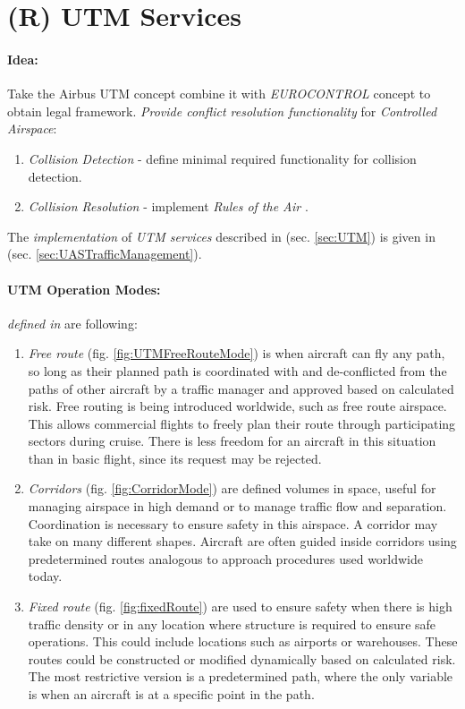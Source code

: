\section{(R) UTM Services}\label{s:utmServicesTheory}
\paragraph{Idea:} Take the Airbus UTM concept \cite{airbusUTM2018blueprint} combine it with \emph{EUROCONTROL} concept \cite{andrewhately2018} to obtain legal framework. \emph{Provide conflict resolution functionality} for \emph{Controlled Airspace}:
\begin{enumerate}
    \item \emph{Collision Detection} - define minimal required functionality for collision detection.
    \item \emph{Collision Resolution} - implement \emph{Rules of the Air} \cite{standard1986recommended}.
\end{enumerate}

The \emph{implementation} of \emph{UTM services} described in (sec. \ref{sec:UTM}) is given in (sec. \ref{sec:UASTrafficManagement}).

\paragraph{UTM Operation Modes:} \emph{defined in } \cite{airbusUTM2018blueprint} are following:
\begin{enumerate}
    \item \emph{Free route} (fig. \ref{fig:UTMFreeRouteMode}) is when aircraft can fly any path, so long as their planned path is coordinated with and de-conflicted from the paths of other aircraft by a traffic manager and approved based on calculated risk. Free routing is being introduced worldwide, such as free route airspace. This allows commercial flights to freely plan their route through participating sectors during cruise. There is less freedom for an aircraft in this situation than in basic flight, since its request may be rejected.
    
    \item\emph{Corridors} (fig. \ref{fig:CorridorMode})  are defined volumes in space, useful for managing airspace in high demand or to manage traffic flow and separation. Coordination is necessary to ensure safety in this airspace. A corridor may take on many different shapes. Aircraft are often guided inside corridors using predetermined routes analogous to approach procedures used worldwide today.
    
    \item\emph{Fixed route} (fig. \ref{fig:fixedRoute}) are used to ensure safety when there is high traffic density or in any location where structure is required to ensure safe operations. This could include locations such as airports or warehouses. These routes could be constructed or modified dynamically based on calculated risk. The most restrictive version is a predetermined path, where the only variable is when an aircraft is at a specific point in the path.
\end{enumerate}

